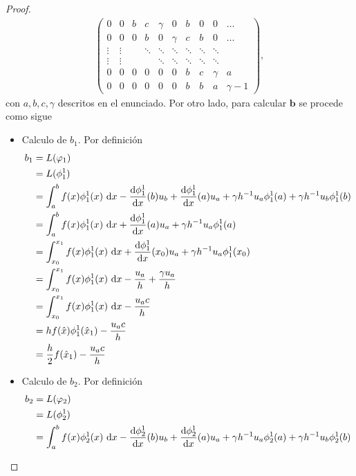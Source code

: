 \documentclass[10pt,a4paper]{report}
\newcommand{\dx}{\textup{d}x}
\providecommand{\Dx}[1]{\frac{\textup{d} #1}{\textup{d}x}}
\begin{document}
\begin{proof}
\begin{align*}
\begin{pmatrix}
    		0 & 0 & b & c & \gamma & 0 & b & 0 & 0 & \hdots\\ 
    		0 & 0 & 0 & b & 0 & \gamma & c & b & 0 & \hdots\\ 
    		\vdots & \vdots &  & \ddots & \ddots & \ddots & \ddots & \ddots & \ddots & \\ 
    		\vdots & \vdots &  &  & \ddots & \ddots & \ddots & \ddots & \ddots & \\ 
    		0 & 0 & 0 & 0 & 0 & 0 & b & c & \gamma & a\\ 
    		0 & 0 & 0 & 0 & 0 & 0 & b & b & a & \gamma -1
    	\end{pmatrix},
    \end{align*}
    con $a,b,c,\gamma$ descritos en el enunciado. Por otro lado, para calcular $\textbf{b}$ se procede como sigue
    \begin{itemize}
    	\item Calculo de $b_{1}$. Por definición
    	\begin{align*}
    		b_{1} &= L(\varphi_{1})\\ 
    		      &= L(\phi^{1}_{1})\\ 
    		      &= \int_{a}^{b} f(x)\phi^{1}_{1}(x)\ \dx - \Dx{\phi^{1}_{1}}(b)u_{b} + \Dx{\phi^{1}_{1}}(a)u_{a} + \gamma h^{-1}u_{a}\phi^{1}_{1}(a) + \gamma h^{-1}u_{b}\phi^{1}_{1}(b)\\
    		      &= \int_{a}^{b} f(x)\phi^{1}_{1}(x)\ \dx + \Dx{\phi^{1}_{1}}(a)u_{a} + \gamma h^{-1}u_{a}\phi^{1}_{1}(a)\\
    		      &= \int_{x_{0}}^{x_{1}} f(x)\phi^{1}_{1}(x)\ \dx + \Dx{\phi^{1}_{1}}(x_{0})u_{a} + \gamma h^{-1}u_{a}\phi^{1}_{1}(x_{0})\\
    		      &= \int_{x_{0}}^{x_{1}} f(x)\phi^{1}_{1}(x)\ \dx -\frac{u_{a}}{h} + \frac{\gamma u_{a}}{h}\\
    		      &= \int_{x_{0}}^{x_{1}} f(x)\phi^{1}_{1}(x)\ \dx - \frac{u_{a}c}{h}\\
    		      &= hf(\hat{x})\phi^{1}_{1}(\hat{x}_{1})- \frac{u_{a}c}{h}\\
    		      &= \frac{h}{2}f(\hat{x}_{1}) - \frac{u_{a}c}{h}
    	\end{align*}
        \item Calculo de $b_{2}$. Por definición
        \begin{align*}
        	b_{2} &= L(\varphi_{2})\\ 
        	&= L(\phi^{1}_{2})\\ 
        	&= \int_{a}^{b} f(x)\phi^{1}_{2}(x)\ \dx - \Dx{\phi^{1}_{2}}(b)u_{b} + \Dx{\phi^{1}_{2}}(a)u_{a} + \gamma h^{-1}u_{a}\phi^{1}_{2}(a) + \gamma h^{-1}u_{b}\phi^{1}_{2}(b)\\

\end{align*}
\end{itemize}
\end{proof}
\end{document}
